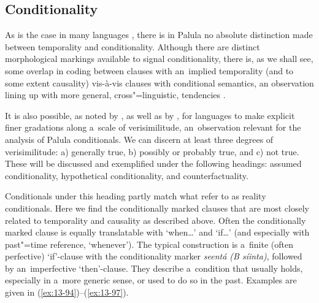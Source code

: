 \subsection{Conditionality}
\label{subsec:13-4-4}

As is the case in many languages \citep[257--258]{thompsonetal2007}, there is in Palula no absolute distinction made between temporality and conditionality. Although there are distinct morphological markings available to signal conditionality, there is, as we shall see, some overlap in coding between clauses with an~implied temporality (and to some extent causality) vis-à-vis clauses with conditional semantics, an observation lining up with more general, cross"=linguistic, tendencies \citep[161]{cristofaro2005}.



It is also possible, as noted by \citet[255--260]{thompsonetal2007}, as well as by \citet[333--334]{givon2001b}, for languages to make explicit finer gradations along a~scale of verisimilitude, an~observation relevant for the analysis of Palula conditionals. We can discern at least three degrees of verisimilitude: a) generally true, b) possibly or probably true, and c) not true. These will be discussed and exemplified under the following headings: assumed conditionality, hypothetical conditionality, and counterfactuality.



 Conditionals under this heading partly match what \citet[255--256]{thompsonetal2007} refer to as reality conditionals. Here we find the conditionally marked clauses that are most closely related to temporality and causality as described above. Often the conditionally marked clause is equally translatable with `when{\ldots}' and `if{\ldots}' (and especially with past"=time reference, `whenever'). The typical construction is a~finite (often perfective) `if'-clause with the conditionality marker \textit{seentá (B síinta)}, followed by an~imperfective `then'-clause. They describe a~condition that usually holds, especially in a~more generic sense, or used to do so in the past. Examples are given in (\ref{ex:13-94})--(\ref{ex:13-97}).

